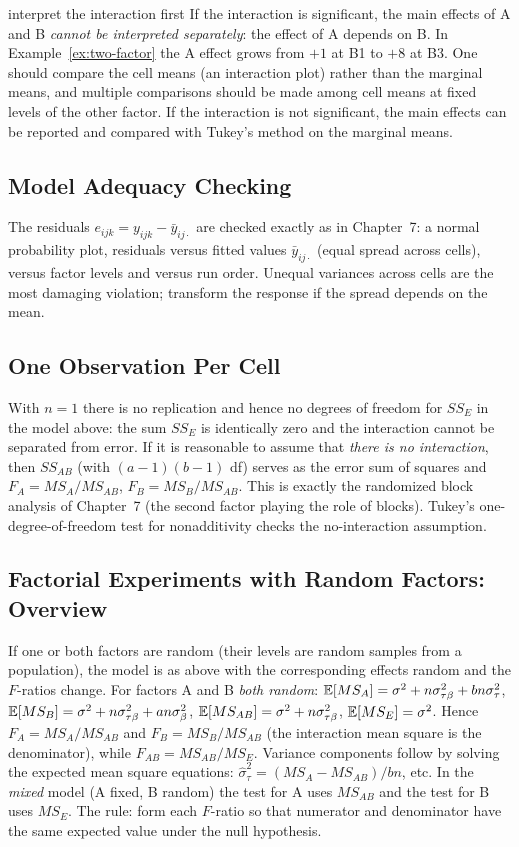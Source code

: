 \begin{pitfall}{interpret the interaction first}
If the interaction is significant, the main effects of A and B \emph{cannot be interpreted separately}: the effect of A depends on B. In Example~\ref{ex:two-factor} the A effect grows from $+1$ at B1 to $+8$ at B3. One should compare the cell means (an interaction plot) rather than the marginal means, and multiple comparisons should be made among cell means at fixed levels of the other factor. If the interaction is not significant, the main effects can be reported and compared with Tukey's method on the marginal means.
\end{pitfall}

\subsection{Model Adequacy Checking}

The residuals $e_{ijk}=y_{ijk}-\bar{y}_{ij\cdot}$ are checked exactly as in Chapter~7: a normal probability plot, residuals versus fitted values $\bar{y}_{ij\cdot}$ (equal spread across cells), versus factor levels and versus run order. Unequal variances across cells are the most damaging violation; transform the response if the spread depends on the mean.

\subsection{One Observation Per Cell}

With $n=1$ there is no replication and hence no degrees of freedom for $SS_E$ in the model above: the sum $SS_E$ is identically zero and the interaction cannot be separated from error. If it is reasonable to assume that \emph{there is no interaction}, then $SS_{AB}$ (with $(a-1)(b-1)$ df) serves as the error sum of squares and $F_A=MS_A/MS_{AB}$, $F_B=MS_B/MS_{AB}$. This is exactly the randomized block analysis of Chapter~7 (the second factor playing the role of blocks). Tukey's one-degree-of-freedom test for nonadditivity checks the no-interaction assumption.

\subsection{Factorial Experiments with Random Factors: Overview}

If one or both factors are random (their levels are random samples from a population), the model is as above with the corresponding effects random and the $F$-ratios change. For factors A and B \emph{both random}: $\mathbb{E}[MS_A]=\sigma^2+n\sigma_{\tau\beta}^2+bn\sigma_\tau^2$, $\mathbb{E}[MS_B]=\sigma^2+n\sigma_{\tau\beta}^2+an\sigma_\beta^2$, $\mathbb{E}[MS_{AB}]=\sigma^2+n\sigma_{\tau\beta}^2$, $\mathbb{E}[MS_E]=\sigma^2$. Hence $F_A=MS_A/MS_{AB}$ and $F_B=MS_B/MS_{AB}$ (the interaction mean square is the denominator), while $F_{AB}=MS_{AB}/MS_E$. Variance components follow by solving the expected mean square equations: $\hat\sigma_\tau^2=(MS_A-MS_{AB})/bn$, etc. In the \emph{mixed} model (A fixed, B random) the test for A uses $MS_{AB}$ and the test for B uses $MS_E$. The rule: form each $F$-ratio so that numerator and denominator have the same expected value under the null hypothesis.

